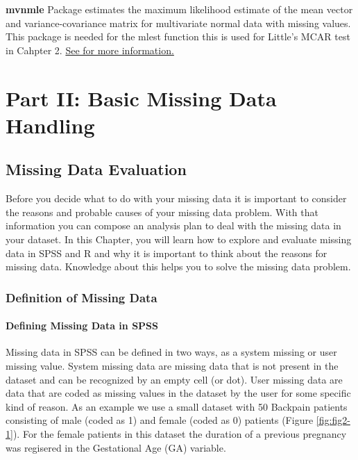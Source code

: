 \documentclass[]{book}
\begin{document}
\textbf{mvnmle} Package estimates the maximum likelihood estimate of the
mean vector and variance-covariance matrix for multivariate normal data
with missing values. This package is needed for the mlest function this
is used for Little's MCAR test in Cahpter 2.
\href{https://cran.r-project.org/web/packages/mvnmle/index.html}{See for
more information.}

\part{Part II: Basic Missing Data
Handling}\label{part-part-ii-basic-missing-data-handling}

\chapter{Missing Data Evaluation}\label{missing-data-evaluation}

Before you decide what to do with your missing data it is important to
consider the reasons and probable causes of your missing data problem.
With that information you can compose an analysis plan to deal with the
missing data in your dataset. In this Chapter, you will learn how to
explore and evaluate missing data in SPSS and R and why it is important
to think about the reasons for missing data. Knowledge about this helps
you to solve the missing data problem.

\section{Definition of Missing Data}\label{definition-of-missing-data}

\subsection{Defining Missing Data in
SPSS}\label{defining-missing-data-in-spss}

Missing data in SPSS can be defined in two ways, as a system missing or
user missing value. System missing data are missing data that is not
present in the dataset and can be recognized by an empty cell (or dot).
User missing data are data that are coded as missing values in the
dataset by the user for some specific kind of reason. As an example we
use a small dataset with 50 Backpain patients consisting of male (coded
as 1) and female (coded as 0) patients (Figure \ref{fig:fig2-1}). For
the female patients in this dataset the duration of a previous pregnancy
was regisered in the Gestational Age (GA) variable.
\end{document}
